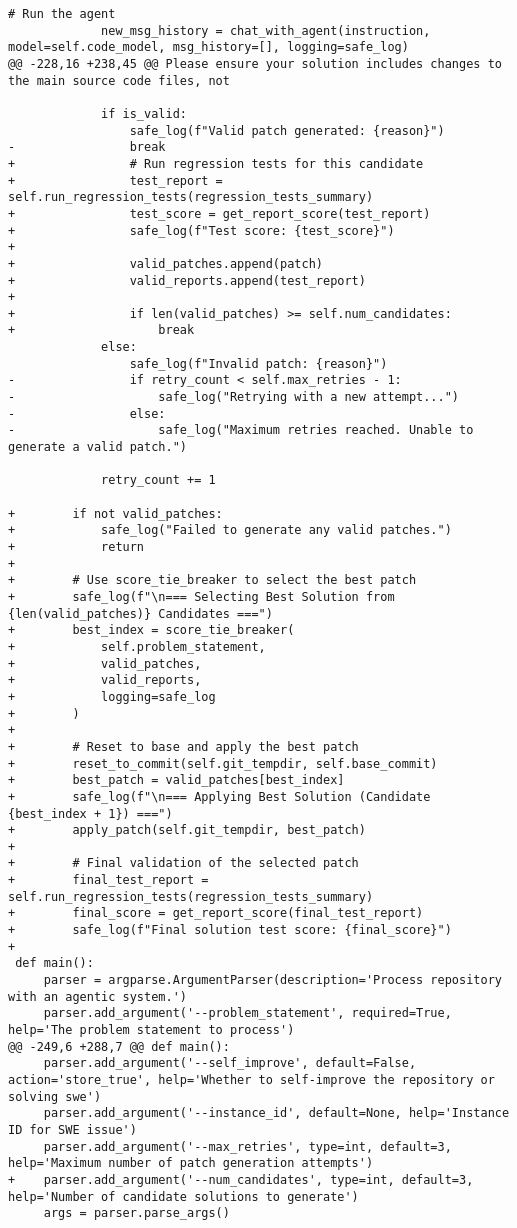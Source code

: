 \begin{lstlisting}[style=diffstyle]
             # Run the agent
             new_msg_history = chat_with_agent(instruction, model=self.code_model, msg_history=[], logging=safe_log)
@@ -228,16 +238,45 @@ Please ensure your solution includes changes to the main source code files, not
             
             if is_valid:
                 safe_log(f"Valid patch generated: {reason}")
-                break
+                # Run regression tests for this candidate
+                test_report = self.run_regression_tests(regression_tests_summary)
+                test_score = get_report_score(test_report)
+                safe_log(f"Test score: {test_score}")
+
+                valid_patches.append(patch)
+                valid_reports.append(test_report)
+
+                if len(valid_patches) >= self.num_candidates:
+                    break
             else:
                 safe_log(f"Invalid patch: {reason}")
-                if retry_count < self.max_retries - 1:
-                    safe_log("Retrying with a new attempt...")
-                else:
-                    safe_log("Maximum retries reached. Unable to generate a valid patch.")
             
             retry_count += 1
 
+        if not valid_patches:
+            safe_log("Failed to generate any valid patches.")
+            return
+
+        # Use score_tie_breaker to select the best patch
+        safe_log(f"\n=== Selecting Best Solution from {len(valid_patches)} Candidates ===")
+        best_index = score_tie_breaker(
+            self.problem_statement,
+            valid_patches,
+            valid_reports,
+            logging=safe_log
+        )
+
+        # Reset to base and apply the best patch
+        reset_to_commit(self.git_tempdir, self.base_commit)
+        best_patch = valid_patches[best_index]
+        safe_log(f"\n=== Applying Best Solution (Candidate {best_index + 1}) ===")
+        apply_patch(self.git_tempdir, best_patch)
+
+        # Final validation of the selected patch
+        final_test_report = self.run_regression_tests(regression_tests_summary)
+        final_score = get_report_score(final_test_report)
+        safe_log(f"Final solution test score: {final_score}")
+
 def main():
     parser = argparse.ArgumentParser(description='Process repository with an agentic system.')
     parser.add_argument('--problem_statement', required=True, help='The problem statement to process')
@@ -249,6 +288,7 @@ def main():
     parser.add_argument('--self_improve', default=False, action='store_true', help='Whether to self-improve the repository or solving swe')
     parser.add_argument('--instance_id', default=None, help='Instance ID for SWE issue')
     parser.add_argument('--max_retries', type=int, default=3, help='Maximum number of patch generation attempts')
+    parser.add_argument('--num_candidates', type=int, default=3, help='Number of candidate solutions to generate')
     args = parser.parse_args()
 

\end{lstlisting}
